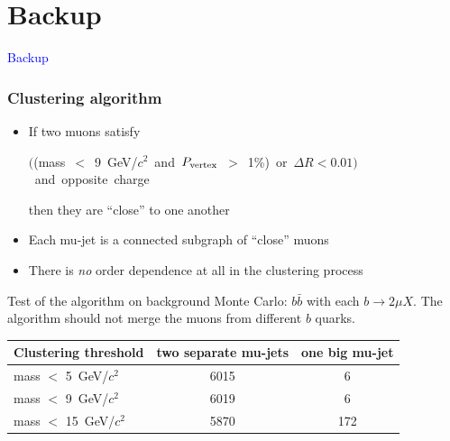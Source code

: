 \documentclass[compress]{beamer}
\newcommand{\s}[1]{{\mbox{\scriptsize #1}}}
\begin{document}
\section*{Backup}
\begin{frame}
\begin{center}
\Huge \textcolor{blue}{Backup}
\end{center}
\end{frame}

\begin{frame}
\frametitle{Clustering algorithm}


\begin{itemize}
\item If two muons satisfy

\mbox{\hspace{-1 cm}$\bigg($(mass $<$ 9~GeV/$c^2$ and $P_\s{vertex}$ $>$ 1\%) or $\Delta R < 0.01$$\bigg)$ and opposite charge\hspace{-1 cm}}

then they are ``close'' to one another

\item Each mu-jet is a connected subgraph of ``close'' muons

\item There is {\it no} order dependence at all in the clustering process
\end{itemize}

Test of the algorithm on background Monte Carlo: $b\bar{b}$ with each
$b \to 2\mu X$.  The algorithm should not merge the muons from
different $b$ quarks.

\vspace{0.25 cm}
\renewcommand{\arraystretch}{1.3}
\begin{tabular}{l c c}
Clustering threshold & two separate mu-jets & one big mu-jet \\\hline
mass $<$ 5~GeV/$c^2$ & 6015 & 6 \\
mass $<$ 9~GeV/$c^2$ & 6019 & 6 \\
mass $<$ 15~GeV/$c^2$ & 5870 & 172
\end{tabular}
\end{frame}
\end{document}

